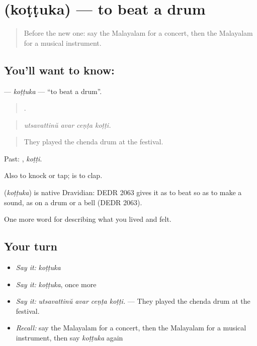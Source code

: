 \section[\texorpdfstring{\ml{കൊട്ടുക} (koṭṭuka)}{കൊട്ടുക (koṭṭuka)}]{ (koṭṭuka) — to beat a drum}

\label{lesson:ML-C561-kottuka-drum}



\begin{quote}
Before the new one: say the Malayalam for a concert, then the Malayalam for a musical instrument.
\end{quote}

\subsection*{You'll want to know: }
\textbf{} — \emph{koṭṭuka} — \textquotedblleft{}to beat a drum\textquotedblright{}.

\begin{quote}
   .
\end{quote}

\begin{quote}
\emph{utsavattinŭ avar ceṇṭa koṭṭi.}
\end{quote}

\begin{quote}
They played the chenda drum at the festival.
\end{quote}

Past: , \emph{koṭṭi}.

Also to knock or tap;   is to clap.

\begin{cousinweb}
\textbf{} (\emph{koṭṭuka}) is native Dravidian: DEDR 2063 gives it as to beat so as to make a sound, as on a drum or a bell (DEDR 2063).
\end{cousinweb}

\begin{grammarlens}[title={What you've built}]
One more word for describing what you lived and felt.
\end{grammarlens}

\subsection*{Your turn}
\begin{itemize}
\raggedright
  \item \emph{Say it:} \emph{koṭṭuka}
  \item \emph{Say it:} \emph{koṭṭuka}, once more
  \item \emph{Say it:} \emph{utsavattinŭ avar ceṇṭa koṭṭi.} — They played the chenda drum at the festival.
  \item \emph{Recall:} say the Malayalam for a concert, then the Malayalam for a musical instrument, then say \emph{koṭṭuka} again
\end{itemize}

